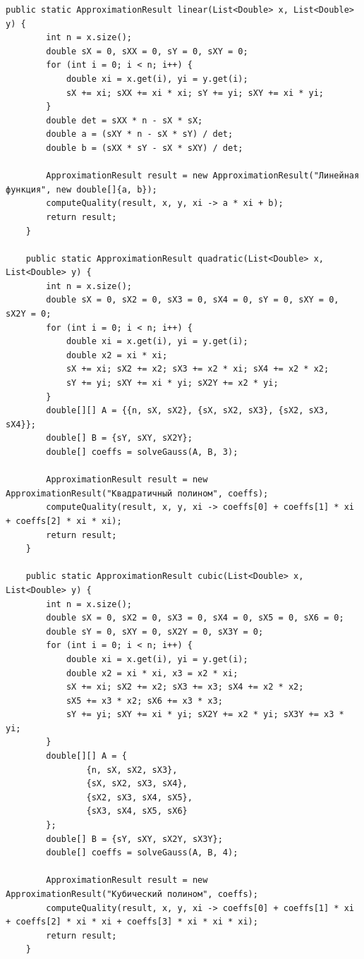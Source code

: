 \begin{lstlisting}[style=javaStyle, label=code:lsm]
    public static ApproximationResult linear(List<Double> x, List<Double> y) {
        int n = x.size();
        double sX = 0, sXX = 0, sY = 0, sXY = 0;
        for (int i = 0; i < n; i++) {
            double xi = x.get(i), yi = y.get(i);
            sX += xi; sXX += xi * xi; sY += yi; sXY += xi * yi;
        }
        double det = sXX * n - sX * sX;
        double a = (sXY * n - sX * sY) / det;
        double b = (sXX * sY - sX * sXY) / det;

        ApproximationResult result = new ApproximationResult("Линейная функция", new double[]{a, b});
        computeQuality(result, x, y, xi -> a * xi + b);
        return result;
    }

    public static ApproximationResult quadratic(List<Double> x, List<Double> y) {
        int n = x.size();
        double sX = 0, sX2 = 0, sX3 = 0, sX4 = 0, sY = 0, sXY = 0, sX2Y = 0;
        for (int i = 0; i < n; i++) {
            double xi = x.get(i), yi = y.get(i);
            double x2 = xi * xi;
            sX += xi; sX2 += x2; sX3 += x2 * xi; sX4 += x2 * x2;
            sY += yi; sXY += xi * yi; sX2Y += x2 * yi;
        }
        double[][] A = {{n, sX, sX2}, {sX, sX2, sX3}, {sX2, sX3, sX4}};
        double[] B = {sY, sXY, sX2Y};
        double[] coeffs = solveGauss(A, B, 3);

        ApproximationResult result = new ApproximationResult("Квадратичный полином", coeffs);
        computeQuality(result, x, y, xi -> coeffs[0] + coeffs[1] * xi + coeffs[2] * xi * xi);
        return result;
    }

    public static ApproximationResult cubic(List<Double> x, List<Double> y) {
        int n = x.size();
        double sX = 0, sX2 = 0, sX3 = 0, sX4 = 0, sX5 = 0, sX6 = 0;
        double sY = 0, sXY = 0, sX2Y = 0, sX3Y = 0;
        for (int i = 0; i < n; i++) {
            double xi = x.get(i), yi = y.get(i);
            double x2 = xi * xi, x3 = x2 * xi;
            sX += xi; sX2 += x2; sX3 += x3; sX4 += x2 * x2;
            sX5 += x3 * x2; sX6 += x3 * x3;
            sY += yi; sXY += xi * yi; sX2Y += x2 * yi; sX3Y += x3 * yi;
        }
        double[][] A = {
                {n, sX, sX2, sX3},
                {sX, sX2, sX3, sX4},
                {sX2, sX3, sX4, sX5},
                {sX3, sX4, sX5, sX6}
        };
        double[] B = {sY, sXY, sX2Y, sX3Y};
        double[] coeffs = solveGauss(A, B, 4);

        ApproximationResult result = new ApproximationResult("Кубический полином", coeffs);
        computeQuality(result, x, y, xi -> coeffs[0] + coeffs[1] * xi + coeffs[2] * xi * xi + coeffs[3] * xi * xi * xi);
        return result;
    }


\end{lstlisting}
